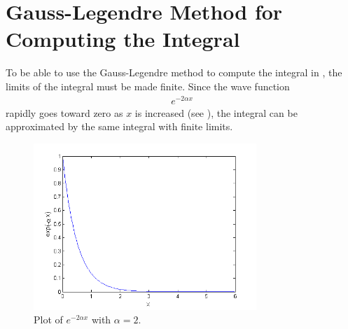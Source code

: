 \section{Gauss-Legendre Method for Computing the Integral}

To be able to use the Gauss-Legendre method to compute the integral in , the limits of the integral must be made  finite.
Since the wave function 
\begin{align}
	e^{-2\alpha x}
\end{align}
rapidly goes toward zero as $x$ is increased (see ), the integral can be approximated  by the same integral with finite limits.

\begin{figure}[H]
	\centering
	\includegraphics[width=0.75\textwidth]{Figures/function_zeropoint.png}
	\caption{Plot of $e^{-2\alpha x}$ with $\alpha = 2$.}
	\label{fig:function_zeropoint}
\end{figure}

